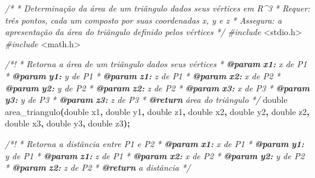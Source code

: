 \documentclass[
  11pt,
  a4paper,
]{scrbook}
\newenvironment{Shaded}{\begin{snugshade}}{\end{snugshade}}
\newcommand{\AnnotationTok}[1]{\textcolor[rgb]{0.56,0.35,0.01}{\textbf{\textit{#1}}}}
\newcommand{\CommentTok}[1]{\textcolor[rgb]{0.56,0.35,0.01}{\textit{#1}}}
\newcommand{\CommentVarTok}[1]{\textcolor[rgb]{0.56,0.35,0.01}{\textbf{\textit{#1}}}}
\newcommand{\DataTypeTok}[1]{\textcolor[rgb]{0.13,0.29,0.53}{#1}}
\newcommand{\ImportTok}[1]{#1}
\newcommand{\NormalTok}[1]{#1}
\newcommand{\OperatorTok}[1]{\textcolor[rgb]{0.81,0.36,0.00}{\textbf{#1}}}
\newcommand{\PreprocessorTok}[1]{\textcolor[rgb]{0.56,0.35,0.01}{\textit{#1}}}
\begin{document}
\begin{Shaded}
\begin{Highlighting}[]
\CommentTok{/*}
\CommentTok{ * Determinação da área de um triângulo dados seus vértices em R\^{}3}
\CommentTok{ * Requer: três pontos, cada um composto por suas coordenadas x, y e z}
\CommentTok{ * Assegura: a apresentação da área do triângulo definido pelos vértices}
\CommentTok{ */}
\PreprocessorTok{\#include }\ImportTok{\textless{}stdio.h\textgreater{}}
\PreprocessorTok{\#include }\ImportTok{\textless{}math.h\textgreater{}}

\CommentTok{/*!}
\CommentTok{ * Retorna a área de um triângulo dados seus vértices}
\CommentTok{ * }\AnnotationTok{@param}\CommentTok{ }\CommentVarTok{x1:}\CommentTok{ x de P1}
\CommentTok{ * }\AnnotationTok{@param}\CommentTok{ }\CommentVarTok{y1:}\CommentTok{ y de P1}
\CommentTok{ * }\AnnotationTok{@param}\CommentTok{ }\CommentVarTok{z1:}\CommentTok{ z de P1}
\CommentTok{ * }\AnnotationTok{@param}\CommentTok{ }\CommentVarTok{x2:}\CommentTok{ x de P2}
\CommentTok{ * }\AnnotationTok{@param}\CommentTok{ }\CommentVarTok{y2:}\CommentTok{ y de P2}
\CommentTok{ * }\AnnotationTok{@param}\CommentTok{ }\CommentVarTok{z2:}\CommentTok{ z de P2}
\CommentTok{ * }\AnnotationTok{@param}\CommentTok{ }\CommentVarTok{x3:}\CommentTok{ x de P3}
\CommentTok{ * }\AnnotationTok{@param}\CommentTok{ }\CommentVarTok{y3:}\CommentTok{ y de P3}
\CommentTok{ * }\AnnotationTok{@param}\CommentTok{ }\CommentVarTok{z3:}\CommentTok{ z de P3}
\CommentTok{ * }\AnnotationTok{@return}\CommentTok{ área do triângulo}
\CommentTok{ */}
\DataTypeTok{double}\NormalTok{ area\_triangulo}\OperatorTok{(}\DataTypeTok{double}\NormalTok{ x1}\OperatorTok{,} \DataTypeTok{double}\NormalTok{ y1}\OperatorTok{,} \DataTypeTok{double}\NormalTok{ z1}\OperatorTok{,}
                      \DataTypeTok{double}\NormalTok{ x2}\OperatorTok{,} \DataTypeTok{double}\NormalTok{ y2}\OperatorTok{,} \DataTypeTok{double}\NormalTok{ z2}\OperatorTok{,}
                      \DataTypeTok{double}\NormalTok{ x3}\OperatorTok{,} \DataTypeTok{double}\NormalTok{ y3}\OperatorTok{,} \DataTypeTok{double}\NormalTok{ z3}\OperatorTok{);}

\CommentTok{/*!}
\CommentTok{ * Retorna a distância entre P1 e P2}
\CommentTok{ * }\AnnotationTok{@param}\CommentTok{ }\CommentVarTok{x1:}\CommentTok{ x de P1}
\CommentTok{ * }\AnnotationTok{@param}\CommentTok{ }\CommentVarTok{y1:}\CommentTok{ y de P1}
\CommentTok{ * }\AnnotationTok{@param}\CommentTok{ }\CommentVarTok{z1:}\CommentTok{ z de P1}
\CommentTok{ * }\AnnotationTok{@param}\CommentTok{ }\CommentVarTok{x2:}\CommentTok{ x de P2}
\CommentTok{ * }\AnnotationTok{@param}\CommentTok{ }\CommentVarTok{y2:}\CommentTok{ y de P2}
\CommentTok{ * }\AnnotationTok{@param}\CommentTok{ }\CommentVarTok{z2:}\CommentTok{ z de P2}
\CommentTok{ * }\AnnotationTok{@return}\CommentTok{ a distância}
\CommentTok{ */}


\end{Highlighting}
\end{Shaded}
\end{document}
